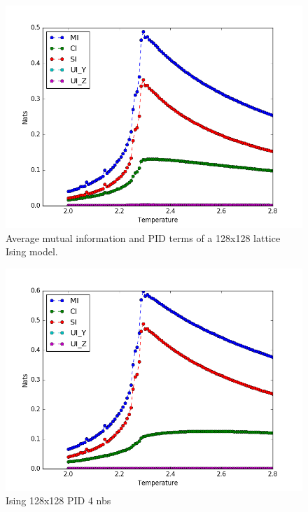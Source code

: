 \documentclass[12pt]{article}
\begin{document}
\begin{figure} [h!]
\begin{center}
\includegraphics[width=\textwidth]{ising-128-pid-2-nbs}
\caption{Average mutual information and PID terms of a 128x128 lattice Ising model.}
\label{fig:ising-128-pid-2-nbs}
\end{center}
\end{figure}

\begin{figure} [h!]
\begin{center}
\includegraphics[width=\textwidth]{ising-128-pid-4-nbs}
\caption{Ising 128x128 PID 4 nbs}
\label{fig:ising-128-pid-4-nbs}
\end{center}
\end{figure}
\end{document}
